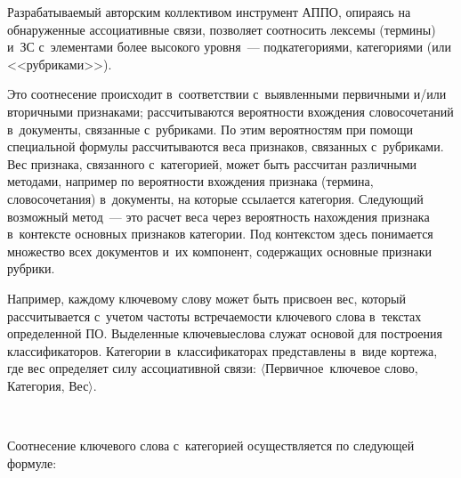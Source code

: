 \begin{multicols}{2}
     Разрабатываемый авторским коллективом инструмент АППО, опираясь
на обнаруженные ассоциативные связи, позволяет соотносить лексемы
(термины) и~ЗС с~элементами более высокого уровня~--- подкатегориями,
категориями (или <<рубриками>>).


     Это соотнесение происходит в~соответствии с~выявленными
первичными и/или вторичными признаками; рассчитываются вероятности
вхождения словосочетаний в~документы, связанные с~руб\-ри\-ка\-ми. По этим
вероятностям при помощи специальной формулы рассчитываются веса
признаков, связанных с~рубриками. Вес признака, связанного с~категорией,
может быть рассчитан различными методами, например по вероятности
вхождения признака (термина, словосочетания) в~документы, на которые
ссылается категория. Следующий возможный метод~--- это расчет веса через
вероятность нахождения признака в~контексте основных признаков
категории. Под контекстом здесь понимается множество всех документов и~их компонент, содержащих основные признаки рубрики.

     Например, каждому ключевому слову может быть присвоен вес,
который рассчитывается с~учетом частоты встречаемости ключевого слова в~текстах определенной ПО. Выделенные ключевые\linebreak \mbox{слова} служат основой для
построения классификаторов. Категории в~классификаторах представлены в~виде кортежа, где вес определяет силу ассоциативной связи:
     $\langle$Первичное\ ключевое слово, {Категория}, {Вес}$\rangle.$

          \begin{figure*}[b] %
      \vspace*{9pt}
 \begin{center}
 \mbox{%
 \epsfxsize=163.337mm
 }
\end{center}
 \vspace*{-9pt}
      \end{figure*}

     Соотнесение ключевого слова с~категорией осуществляется по
следующей формуле:

\vspace*{-6pt}


\end{multicols}
